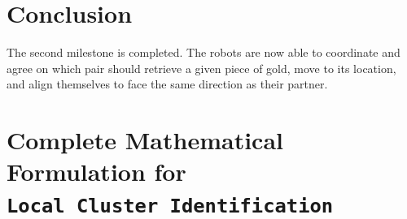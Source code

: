 \documentclass[12pt,a4paper]{article}
\begin{document}
\section{Conclusion}
The second milestone is completed. The robots are now able to coordinate and agree on which pair should retrieve a given piece of gold, move to its location, and align themselves to face the same direction as their partner. 

\newpage
\appendix
\section{\texorpdfstring{Complete Mathematical Formulation for \\ \texttt{Local Cluster Identification}}{Complete Mathematical Formulation for Local Cluster Identification}}
\label{app:cluster}
\end{document}
